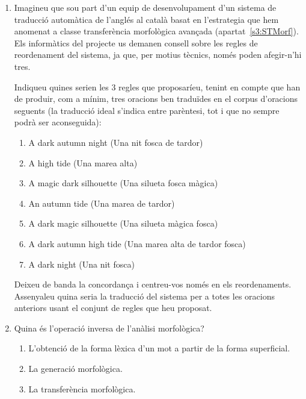 \begin{enumerate}
    \item Imagineu que sou part d'un equip de desenvolupament d'un
      sistema de traducció automàtica de l'anglés al català basat en
      l'estrategia que hem anomenat a classe transferència morfològica
      avançada (apartat~\ref{s3:STMorf}). Els informàtics del projecte us demanen consell sobre
      les regles de reordenament del sistema, ja que, per motius
      tècnics, només poden afegir-n'hi tres.
      
      Indiqueu quines serien les 3 regles que proposaríeu, tenint en
      compte que han de produir, com a mínim, tres oracions ben
      traduïdes en el corpus d'oracions seguents (la traducció ideal
      s'indica entre parèntesi, tot i que no sempre podrà ser
      aconseguida):

    \begin{enumerate}
    \item \textsf{A dark autumn night} (\textsf{Una nit fosca de tardor})

    \item \textsf{A high tide} (\textsf{Una marea alta})
      
    \item \textsf{A magic dark silhouette} (\textsf{Una silueta fosca
        màgica})

    \item \textsf{An autumn tide} (\textsf{Una marea de tardor})

    \item \textsf{A dark magic silhouette} (\textsf{Una silueta màgica fosca})

    \item \textsf{A dark autumn high tide} (\textsf{Una marea alta de
    tardor fosca})
 
\item \textsf{A dark night} (\textsf{Una nit fosca})
    \end{enumerate}
    
    Deixeu de banda la concordança i centreu-vos només en els
    reordenaments. Assenyaleu quina seria la traducció del sistema
    per a totes les oracions anteriors usant el conjunt de regles que
    heu proposat.


\item Quina és l'operació inversa de l'anàlisi morfològica?
\begin{enumerate}
\item L'obtenció de la forma lèxica d'un mot a partir de la forma
superficial.
\item La generació morfològica.
\item La transferència morfològica.
\end{enumerate}


\end{enumerate}
